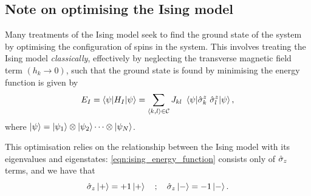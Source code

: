 
\par 
\subsection{Note on optimising the Ising model}\label{sec:ising_optimisation}
Many treatments of the Ising model seek to find the ground state
    of the system by optimising the configuration of spins in the system. 
This involves treating the Ising model \emph{classically}, 
    effectively by neglecting the transverse magnetic field term $(h_k \rightarrow 0)$,
    such that the ground state is found by minimising the energy function is given by
\begin{equation}
    \label{eqn:ising_energy_function}
    E_I = \braket{\psi | H_I | \psi} = 
    \sum_{{ \langle k, l \rangle } \in \mathcal{C}} J_{kl}  \ \braket{ \psi |  \hat{\sigma}_k^z \ \hat{\sigma}_{l}^z | \psi }, 
\end{equation}
    where $\ket{\psi} = \ket{\psi_1} \otimes \ket{\psi_2} \dots \otimes \ket{\psi_N}$. 

This optimisation relies on the relationship between the Ising model with its eigenvalues and eigenstates:
    \cref{eqn:ising_energy_function} consists only of $\hat{\sigma}_{z}$ terms, and we have that 
\begin{equation}
    \sz \ket{+} = +1 \ket{+} \ \ \ ; \ \ \ 
    \sz \ket{-} = -1 \ket{-}. 
\end{equation}

